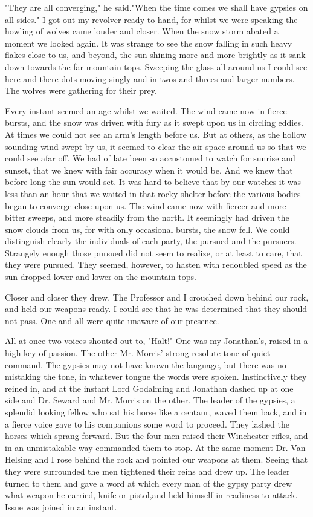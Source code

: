 "They are all converging," he said."When the time comes we shall have gypsies on all sides." I got out my revolver ready to hand, for whilst we were speaking the howling of wolves came louder and closer. When the snow storm abated a moment we looked again. It was strange to see the snow falling in such heavy flakes close to us, and beyond, the sun shining more and more brightly as it sank down towards the far mountain tops. Sweeping the glass all around us I could see here and there dots moving singly and in twos and threes and larger numbers. The wolves were gathering for their prey. 

Every instant seemed an age whilst we waited. The wind came now in fierce bursts, and the snow was driven with fury as it swept upon us in circling eddies. At times we could not see an arm's length before us. But at others, as the hollow sounding wind swept by us, it seemed to clear the air space around us so that we could see afar off. We had of late been so accustomed to watch for sunrise and sunset, that we knew with fair accuracy when it would be. And we knew that before long the sun would set. It was hard to believe that by our watches it was less than an hour that we waited in that rocky shelter before the various bodies began to converge close upon us. The wind came now with fiercer and more bitter sweeps, and more steadily from the north. It seemingly had driven the snow clouds from us, for with only occasional bursts, the snow fell. We could distinguish clearly the individuals of each party, the pursued and the pursuers. Strangely enough those pursued did not seem to realize, or at least to care, that they were pursued. They seemed, however, to hasten with redoubled speed as the sun dropped lower and lower on the mountain tops. 

Closer and closer they drew. The Professor and I crouched down behind our rock, and held our weapons ready. I could see that he was determined that they should not pass. One and all were quite unaware of our presence. 

All at once two voices shouted out to, "Halt!" One was my Jonathan's, raised in a high key of passion. The other Mr. Morris' strong resolute tone of quiet command. The gypsies may not have known the language, but there was no mistaking the tone, in whatever tongue the words were spoken. Instinctively they reined in, and at the instant Lord Godalming and Jonathan dashed up at one side and Dr. Seward and Mr. Morris on the other. The leader of the gypsies, a splendid looking fellow who sat his horse like a centaur, waved them back, and in a fierce voice gave to his companions some word to proceed. They lashed the horses which sprang forward. But the four men raised their Winchester rifles, and in an unmistakable way commanded them to stop. At the same moment Dr. Van Helsing and I rose behind the rock and pointed our weapons at them. Seeing that they were surrounded the men tightened their reins and drew up. The leader turned to them and gave a word at which every man of the gypsy party drew what weapon he carried, knife or pistol,and held himself in readiness to attack. Issue was joined in an instant. 

